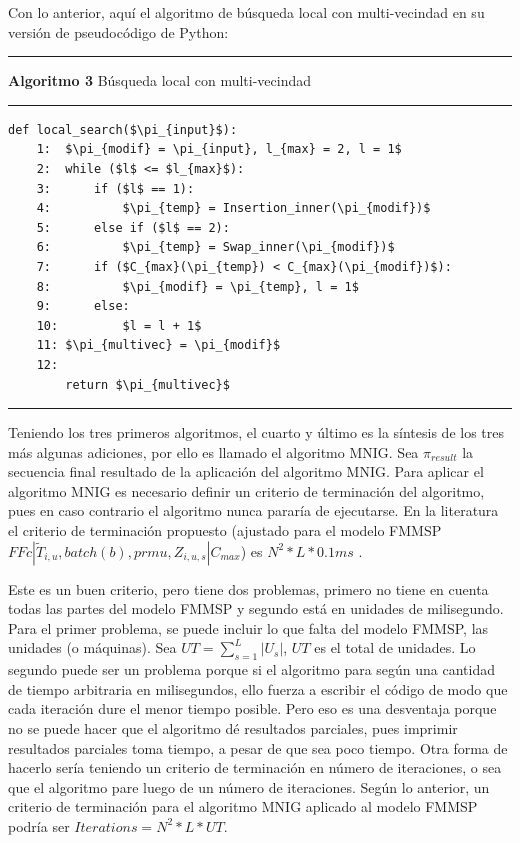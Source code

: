 \documentclass{article}
\def\notac_modelo{$FFc | \tilde{T}_{i, u}, batch(b), prmu, Z_{i, u, s} | C_{max}$}
\begin{document}
\vspace{\baselineskip}
Con lo anterior, aquí el algoritmo de búsqueda local con multi-vecindad en su versión de pseudocódigo de Python:

\noindent\noindent
\rule{\linewidth}{0.4pt}

\textbf{Algoritmo 3} Búsqueda local con multi-vecindad

\noindent\noindent
\rule{\linewidth}{0.4pt}

\begin{lstlisting}[mathescape=true]
    def local_search($\pi_{input}$):
    1:  $\pi_{modif} = \pi_{input}, l_{max} = 2, l = 1$
    2:  while ($l$ <= $l_{max}$):
    3:      if ($l$ == 1):
    4:          $\pi_{temp} = Insertion_inner(\pi_{modif})$
    5:      else if ($l$ == 2):
    6:          $\pi_{temp} = Swap_inner(\pi_{modif})$
    7:      if ($C_{max}(\pi_{temp}) < C_{max}(\pi_{modif})$):
    8:          $\pi_{modif} = \pi_{temp}, l = 1$
    9:      else:
    10:         $l = l + 1$
    11: $\pi_{multivec} = \pi_{modif}$
    12:
        return $\pi_{multivec}$
\end{lstlisting}

\noindent\noindent
\rule{\linewidth}{0.4pt}

\vspace{\baselineskip}
Teniendo los tres primeros algoritmos, el cuarto y último es la síntesis de los tres más algunas adiciones, por ello es llamado el algoritmo MNIG. Sea $\pi_{result}$ la secuencia final resultado de la aplicación del algoritmo MNIG. Para aplicar el algoritmo MNIG es necesario definir un criterio de terminación del algoritmo, pues en caso contrario el algoritmo nunca pararía de ejecutarse. En la literatura el criterio de terminación propuesto (ajustado para el modelo FMMSP \notac_modelo) es $N^2*L*0.1ms$ \autocite{algMNIG}. 

\vspace{\baselineskip}
Este es un buen criterio, pero tiene dos problemas, primero no tiene en cuenta todas las partes del modelo FMMSP y segundo está en unidades de milisegundo. Para el primer problema, se puede incluir lo que falta del modelo FMMSP, las unidades (o máquinas). Sea $UT = \sum_{s = 1}^{L}|U_{s}|$, $UT$ es el total de unidades. Lo segundo puede ser un problema porque si el algoritmo para según una cantidad de tiempo arbitraria en milisegundos, ello fuerza a escribir el código de modo que cada iteración dure el menor tiempo posible. Pero eso es una desventaja porque no se puede hacer que el algoritmo dé resultados parciales, pues imprimir resultados parciales toma tiempo, a pesar de que sea poco tiempo. Otra forma de hacerlo sería teniendo un criterio de terminación en número de iteraciones, o sea que el algoritmo pare luego de un número de iteraciones. Según lo anterior, un criterio de terminación para el algoritmo MNIG aplicado al modelo FMMSP podría ser $Iterations = N^2*L*UT$.
\end{document}
